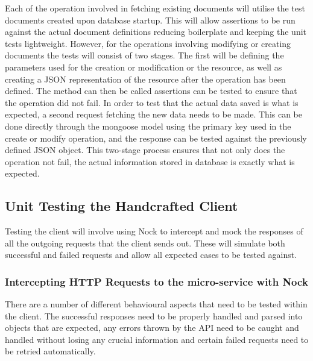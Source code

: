 Each of the operation involved in fetching existing documents will utilise the test documents created upon database startup. This will allow assertions to be run against the actual document definitions reducing boilerplate and keeping the unit tests lightweight. However, for the operations involving modifying or creating documents the tests will consist of two stages. The first will be defining the parameters used for the creation or modification or the resource, as well as creating a JSON representation of the resource after the operation has been defined. The method can then be called assertions can be tested to ensure that the operation did not fail. In order to test that the actual data saved is what is expected, a second request fetching the new data needs to be made. This can be done directly through the mongoose model using the primary key used in the create or modify operation, and the response can be tested against the previously defined JSON object. This two-stage process ensures that not only does the operation not fail, the actual information stored in database is exactly what is expected.
\subsection{Unit Testing the Handcrafted Client}
Testing the client will involve using Nock to intercept and mock the responses of all the outgoing requests that the client sends out. These will simulate both successful and failed requests and allow all expected cases to be tested against.
\subsubsection{Intercepting HTTP Requests to the micro-service with Nock}
There are a number of different behavioural aspects that need to be tested within the client. The successful responses need to be properly handled and parsed into objects that are expected, any errors thrown by the API need to be caught and handled without losing any crucial information and certain failed requests need to be retried automatically.

